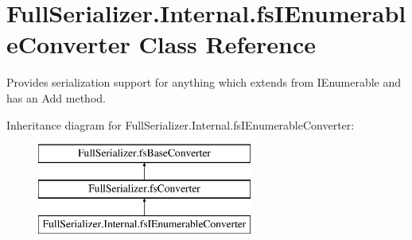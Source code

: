 \hypertarget{class_full_serializer_1_1_internal_1_1fs_i_enumerable_converter}{}\section{Full\+Serializer.\+Internal.\+fs\+I\+Enumerable\+Converter Class Reference}
\label{class_full_serializer_1_1_internal_1_1fs_i_enumerable_converter}


Provides serialization support for anything which extends from {\ttfamily I\+Enumerable} and has an {\ttfamily Add} method.  


Inheritance diagram for Full\+Serializer.\+Internal.\+fs\+I\+Enumerable\+Converter\+:\begin{figure}[H]
\begin{center}
\leavevmode
\includegraphics[height=3.000000cm]{class_full_serializer_1_1_internal_1_1fs_i_enumerable_converter}
\end{center}
\end{figure}
